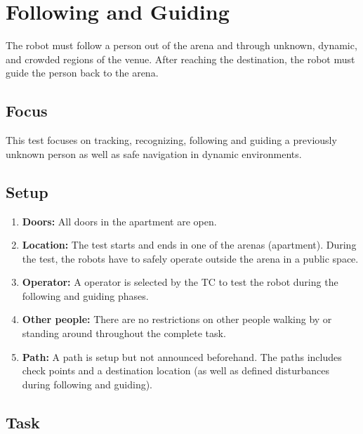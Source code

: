 \section{Following and Guiding}

The robot must follow a person out of the arena and through unknown, dynamic, and crowded regions of the venue. After reaching the destination, the robot must guide the person back to the arena.

\subsection{Focus}
This test focuses on tracking, recognizing, following and guiding a previously unknown person as well as safe navigation in dynamic environments.

\subsection{Setup}

\begin{enumerate}
\item \textbf{Doors:} All doors in the apartment are open.
\item \textbf{Location:} The test starts and ends in one of the arenas (apartment). During the test, the robots have to safely operate outside the arena in a public space.
\item \textbf{Operator:} A  operator is selected by the TC to test the robot during the following and guiding phases.
\item \textbf{Other people:} There are no restrictions on other people walking by or standing around throughout the complete task.
\item \textbf{Path:} A path is setup but not announced beforehand. The paths includes check points and a destination location (as well as defined disturbances during following and guiding).
\end{enumerate}

\subsection{Task}


